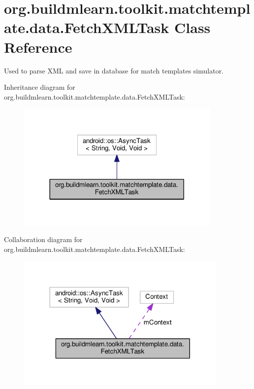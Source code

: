 \hypertarget{classorg_1_1buildmlearn_1_1toolkit_1_1matchtemplate_1_1data_1_1FetchXMLTask}{}\section{org.\+buildmlearn.\+toolkit.\+matchtemplate.\+data.\+Fetch\+X\+M\+L\+Task Class Reference}
\label{classorg_1_1buildmlearn_1_1toolkit_1_1matchtemplate_1_1data_1_1FetchXMLTask}


Used to parse X\+ML and save in database for match template\textquotesingle{}s simulator.  




Inheritance diagram for org.\+buildmlearn.\+toolkit.\+matchtemplate.\+data.\+Fetch\+X\+M\+L\+Task\+:
\nopagebreak
\begin{figure}[H]
\begin{center}
\leavevmode
\includegraphics[width=284pt]{classorg_1_1buildmlearn_1_1toolkit_1_1matchtemplate_1_1data_1_1FetchXMLTask__inherit__graph}
\end{center}
\end{figure}


Collaboration diagram for org.\+buildmlearn.\+toolkit.\+matchtemplate.\+data.\+Fetch\+X\+M\+L\+Task\+:
\nopagebreak
\begin{figure}[H]
\begin{center}
\leavevmode
\includegraphics[width=293pt]{classorg_1_1buildmlearn_1_1toolkit_1_1matchtemplate_1_1data_1_1FetchXMLTask__coll__graph}
\end{center}
\end{figure}
